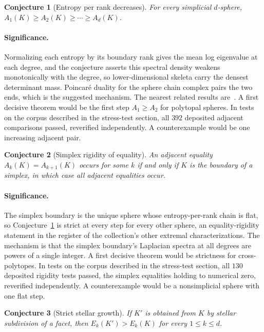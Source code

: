 \documentclass[11pt]{article}
\newtheorem{conjecture}{Conjecture}
\theoremstyle{definition}
\begin{document}
\begin{conjecture}[Entropy per rank decreases]\label{z17}
For every simplicial $d$-sphere, $A_1(K)\ge A_2(K)\ge\cdots\ge A_d(K)$.
\end{conjecture}

\paragraph{Significance.}
Normalizing each entropy by its boundary rank gives the mean log eigenvalue at each degree, and the conjecture asserts this spectral density weakens monotonically with the degree, so lower-dimensional skeleta carry the densest determinant mass.  Poincar\'e duality for the sphere chain complex pairs the two ends, which is the suggested mechanism.  The nearest related results are~\cite{DKM09,MMRW15}.  A first decisive theorem would be the first step $A_1\ge A_2$ for polytopal spheres.  In tests on the corpus described in the stress-test section, all $392$ deposited adjacent comparisons passed, reverified independently.  A counterexample would be one increasing adjacent pair.

\begin{conjecture}[Simplex rigidity of equality]\label{z18}
An adjacent equality $A_k(K)=A_{k+1}(K)$ occurs for some $k$ if and only if $K$ is the boundary of a simplex, in which case all adjacent equalities occur.
\end{conjecture}

\paragraph{Significance.}
The simplex boundary is the unique sphere whose entropy-per-rank chain is flat, so Conjecture~\ref{z17} is strict at every step for every other sphere, an equality-rigidity statement in the register of the collection's other extremal characterizations.  The mechanism is that the simplex boundary's Laplacian spectra at all degrees are powers of a single integer.  A first decisive theorem would be strictness for cross-polytopes.  In tests on the corpus described in the stress-test section, all $130$ deposited rigidity tests passed, the simplex equalities holding to numerical zero, reverified independently.  A counterexample would be a nonsimplicial sphere with one flat step.

\begin{conjecture}[Strict stellar growth]\label{z19}
If $K'$ is obtained from $K$ by stellar subdivision of a facet, then $E_k(K')>E_k(K)$ for every $1\le k\le d$.
\end{conjecture}
\end{document}
